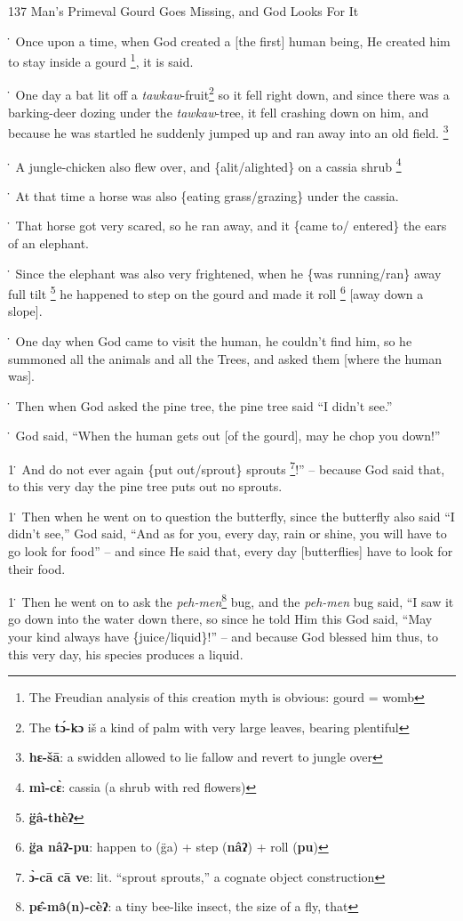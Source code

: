 
137 Man's Primeval Gourd Goes Missing, and God Looks For It

\. Once upon a time, when God created a [the first] human being, He created him
to stay inside a gourd \footnote{The Freudian analysis of this creation myth is obvious: gourd = womb}, it is said.

\. One day a bat lit off a \textit{tawkaw}-fruit\footnote{The \textbf{tɔ́-kɔ} iš a kind of palm with very large leaves, bearing plentiful} so it fell right down, and
since there was a barking-deer dozing under the \textit{tawkaw}-tree, it fell crashing
down on him, and because he was startled he suddenly jumped up and ran away into
an old field. \footnote{\textbf{hɛ-šā}: a swidden allowed to lie fallow and revert to jungle over}

\. A jungle-chicken also flew over, and \{alit/alighted\} on a cassia shrub \footnote{\textbf{mì-cɛ̀}: cassia (a shrub with red flowers)}

\. At that time a horse was also \{eating grass/grazing\} under the cassia.

\. That horse got very scared, so he ran away, and it \{came to/ entered\} the
ears of an elephant.

\. Since the elephant was also very frightened, when he \{was running/ran\} away
full tilt \footnote{\textbf{g̈â-thèʔ}} he happened to step on the gourd and made it roll \footnote{\textbf{g̈a nâʔ-pu}: happen to (g̈a) + step (\textbf{nâʔ}) + roll (\textbf{pu})} [away down
a slope].

\. One day when God came to visit the human, he couldn't find him, so he summoned
all the animals and all the Trees, and asked them [where the human was].

\. Then when God asked the pine tree, the pine tree said ``I didn't see.''

\. God said, ``When the human gets out [of the gourd], may he chop you down!''

1\. And do not ever again \{put out/sprout\} sprouts \footnote{\textbf{ɔ̀-cā cā ve}: lit. ``sprout sprouts,'' a cognate object construction}!'' -- because God said
that, to this very day the pine tree puts out no sprouts.

1\. Then when he went on to question the butterfly, since the butterfly also said
``I didn't see,'' God said, ``And as for you, every day, rain or shine, you will
have to go look for food'' -- and since He said that, every day [butterflies] have
to look for their food.

1\. Then he went on to ask the \textit{peh-men}\footnote{\textbf{pɛ̂-mə̂(n)-cèʔ}: a tiny bee-like insect, the size of a fly, that} bug, and the \textit{peh-men}
bug said, ``I saw it go down into the water down there, so since he told Him this
God said, ``May your kind always have \{juice/liquid\}!'' -- and because God blessed
him thus, to this very day, his species produces a liquid.

